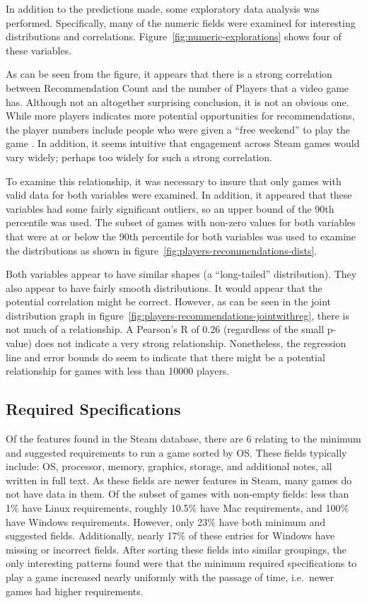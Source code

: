 \documentclass[letterpaper,10pt,twocolumn]{article}
\begin{document}
In addition to the predictions made, some exploratory data analysis was performed.
Specifically, many of the numeric fields were examined for interesting distributions
and correlations. Figure~\ref{fig:numeric-explorations} shows four of these variables.

As can be seen from the figure, it appears that there is a strong correlation
between Recommendation Count and the number of Players that a video game has.
Although not an altogether surprising conclusion, it is not an obvious one.
While more players indicates more potential opportunities for recommendations,
the player numbers include people who were given a ``free weekend'' to play
the game \cite{steamspy}. In addition, it seems intuitive that engagement
across Steam games would vary widely; perhaps too widely for such a strong
correlation.

To examine this relationship, it was necessary to insure that only games with
valid data for both variables were examined. In addition, it appeared that
these variables had some fairly significant outliers, so an upper bound of the
90th percentile was used. The subset of games with non-zero values for both
variables that were at or below the 90th percentile for both variables was used to
examine the distributions as shown in figure~\ref{fig:players-recommendations-dists}.

Both variables appear to have similar shapes (a ``long-tailed''
distribution). They also appear to have fairly smooth distributions. It would
appear that the potential correlation might be correct. However, as can be
seen in the joint distribution graph in figure~\ref{fig:players-recommendations-jointwithreg},
there is not much of a relationship. A Pearson's R of 0.26
(regardless of the small p-value) does not indicate a very strong
relationship. Nonetheless, the regression line and error bounds do seem to
indicate that there might be a potential relationship for games with less
than 10000 players.

\subsection{Required Specifications}

Of the features found in the Steam database, there are 6 relating to the
minimum and suggested requirements to run a game sorted by OS. These fields
typically include: OS, processor, memory, graphics, storage, and additional
notes, all written in full text. As these fields are newer features in Steam,
many games do not have data in them. Of the subset of games with non-empty
fields: less than 1\% have Linux requirements, roughly 10.5\% have Mac
requirements, and 100\% have Windows requirements. However, only 23\% have both
minimum and suggested fields. Additionally, nearly 17\% of these entries for
Windows have missing or incorrect fields. After sorting these fields into
similar groupings, the only interesting patterns found were that the minimum
required specifications to play a game increased nearly uniformly with the
passage of time, i.e.\ newer games had higher requirements.
\end{document}

